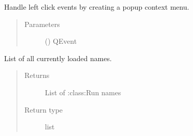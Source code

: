 \documentclass[letterpaper,10pt,english]{sphinxmanual}
\begin{document}
\begin{fulllineitems}
\begin{fulllineitems}
\begin{quote}
\begin{description}
\end{description}\end{quote}

\end{fulllineitems}


\begin{fulllineitems}
\label{\detokenize{polo.widgets:polo.widgets.run_tree.RunTree.contextMenuEvent}}
Handle left click events by creating a popup context menu.
\begin{quote}\begin{description}
\item[{Parameters}] \leavevmode
{} () \textendash{} QEvent

\end{description}\end{quote}

\end{fulllineitems}


\begin{fulllineitems}
\label{\detokenize{polo.widgets:polo.widgets.run_tree.RunTree.current_run_names}}
List of all currently loaded  names.
\begin{quote}\begin{description}
\item[{Returns}] \leavevmode
List of :class:Run\textasciigrave{} names

\item[{Return type}] \leavevmode
list

\end{description}\end{quote}

\end{fulllineitems}



\end{fulllineitems}
\end{document}
